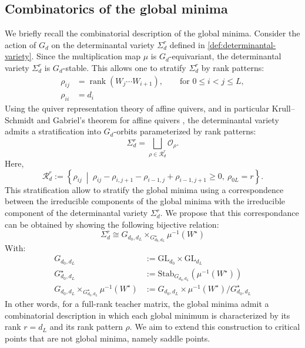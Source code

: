 \documentclass{article}
\newcommand{\rk}{\operatorname{rank}}
\theoremstyle{definition}
\begin{document}
\subsection{Combinatorics of the global minima}
We briefly recall the combinatorial description of the global minima. Consider the action of $G_d$ on the determinantal variety $\Sigma_d^r$ defined in \ref{def:determinantal-variety}. Since the multiplication map $\mu$ is $G_d$-equivariant, the determinantal variety $\Sigma_d^r$ is $G_d$-stable. This allows one to stratify $\Sigma_d^r$ by rank patterns:
\begin{align*}
    \rho_{ij} & = \rk(W_{j}\cdots W_{i+1}), \qquad \text{for } 0 \leq i < j \leq L, \\
    \rho_{ii} & = d_i
\end{align*}
Using the quiver representation theory of affine quivers, and in particular Krull--Schmidt and Gabriel's theorem for affine quivers \cite{lehalleur2024geometry}, the determinantal variety admits a stratification into $G_d$-orbits parameterized by rank patterns:
\begin{equation*}
    \Sigma_d^r = \bigsqcup_{\rho\in \mathcal{R}_d^r} \mathcal{O}_{\rho}.
\end{equation*}
Here,
\begin{equation*}
    \mathcal{R}_d^r := \left\{\rho_{ij}\ \middle|\ \rho_{ij} - \rho_{i,j+1} - \rho_{i-1,j} + \rho_{i-1,j+1} \geq 0,\ \rho_{0L} = r \right\}.
\end{equation*}
This stratification allow to stratify the global minima using a correspondence between the irreducible components of the global minima with the irreducible component of the determinantal variety $\Sigma_d^r$. We propose that this correspondance can be obtained by showing the following bijective relation:
\begin{equation*}
    \Sigma_d^{r} \cong G_{d_0,d_L} \times_{G^{\star}_{d_0,d_L}} \mu^{-1}(W^{\star})
\end{equation*}
With:
\begin{align*}
    G_{d_0,d_L} & := \text{GL}_{d_0}\times\text{GL}_{d_L} \\ 
    G^{\star}_{d_0,d_L} & := \text{Stab}_{G_{d_0,d_L}}(\mu^{-1}(W^{\star})) \\
    G_{d_0,d_L} \times_{G^{\star}_{d_0,d_L}} \mu^{-1}(W^{\star}) & := G_{d_0,d_L} \times \mu^{-1}(W^{\star})/G^{\star}_{d_0,d_L}
\end{align*}
In other words, for a full-rank teacher matrix, the global minima admit a combinatorial description in which each global minimum is characterized by its rank $r=d_L$ and its rank pattern $\rho$. We aim to extend this construction to critical points that are not global minima, namely saddle points.
\end{document}
